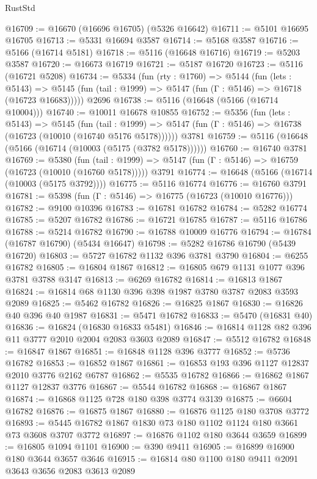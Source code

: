 \begin{lexlean}{RustStd}
\begin{coremodule}
{\begin{coremodule}
{{{{{{{{{{{{{{{{{{{{{{{{{{{{{{{@16709 := @16670 (@16696 @16705) (@5326 @16642)
@16711 := @5101 @16695 @16705
@16713 := @5331 @16694 @3587
@16714 := @5168 @3587
@16716 := @5166 (@16714 @5181)
@16718 := @5116 (@16648 @16716)
@16719 := @5203 @3587
@16720 := @16673 @16719
@16721 := @5187 @16720
@16723 := @5116 (@16721 @5208)
@16734 := @5334
    (fun (rty : @1760) =>
    @5144
      (fun (lets : @5143) =>
      @5145 (fun (tail : @1999) => @5147 (fun (Γ : @5146) => @16718 (@16723 @16683)))))
    @2696
@16738 := @5116 (@16648 (@5166 (@16714 @10004)))
@16740 := @10011 @16678 @10855
@16752 := @5356
    (fun (lets : @5143) =>
    @5145
      (fun (tail : @1999) =>
      @5147 (fun (Γ : @5146) => @16738 (@16723 (@10010 (@16740 @5176 @5178))))))
    @3781
@16759 := @5116 (@16648 (@5166 (@16714 (@10003 (@5175 (@3782 @5178))))))
@16760 := @16740 @3781
@16769 := @5380
    (fun (tail : @1999) => @5147 (fun (Γ : @5146) => @16759 (@16723 (@10010 (@16760 @5178)))))
    @3791
@16774 := @16648 (@5166 (@16714 (@10003 (@5175 @3792))))
@16775 := @5116 @16774
@16776 := @16760 @3791
@16781 := @5398 (fun (Γ : @5146) => @16775 (@16723 (@10010 @16776)))
@16782 := @9100 @10396
@16783 := @16781 @16782
@16784 := @5282 @16774
@16785 := @5207 @16782
@16786 := @16721 @16785
@16787 := @5116 @16786
@16788 := @5214 @16782
@16790 := @16788 @10009 @16776
@16794 := @16784 (@16787 @16790) (@5434 @16647)
@16798 := @5282 @16786 @16790 (@5439 @16720)
@16803 := @5727 @16782 @1132 @396 @3781 @3790
@16804 := @6255 @16782
@16805 := @16804 @1867
@16812 := @16805 @679 @1131 @1077 @396 @3781 @3788 @3147
@16813 := @6269 @16782
@16814 := @16813 @1867
@16824 := @16814 @68 @1130 @396 @398 @1987 @3780 @3787 @2083 @3593 @2089
@16825 := @5462 @16782
@16826 := @16825 @1867
@16830 := @16826 @40 @396 @40 @1987
@16831 := @5471 @16782
@16833 := @5470 (@16831 @40)
@16836 := @16824 (@16830 @16833 @5481)
@16846 := @16814 @1128 @82 @396 @11 @3777 @2010 @2004 @2083 @3603 @2089
@16847 := @5512 @16782
@16848 := @16847 @1867
@16851 := @16848 @1128 @396 @3777
@16852 := @5736 @16782
@16853 := @16852 @1867
@16861 := @16853 @193 @396 @1127 @12837 @2010 @3776 @2162 @6787
@16862 := @5535 @16782
@16866 := @16862 @1867 @1127 @12837 @3776
@16867 := @5544 @16782
@16868 := @16867 @1867
@16874 := @16868 @1125 @728 @180 @398 @3774 @3139
@16875 := @6604 @16782
@16876 := @16875 @1867
@16880 := @16876 @1125 @180 @3708 @3772
@16893 := @5445 @16782 @1867 @1830 @73 @180 @1102 @1124 @180 @3661 @73 @3608 @3707 @3772
@16897 := @16876 @1102 @180 @3644 @3659
@16899 := @16805 @1094 @1101
@16900 := @390 @9411
@16905 := @16899 @16900 @180 @3644 @3657 @3646
@16915 := @16814 @80 @1100 @180 @9411 @2091 @3643 @3656 @2083 @3613 @2089
}}}}}}}}}}}}}}}}}}}}}}}}}}}}}}}
\end{coremodule}}
\end{coremodule}
\end{lexlean}

